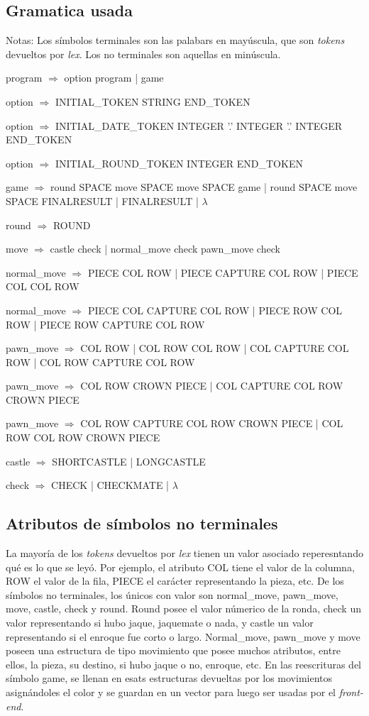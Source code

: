 \documentclass[a4paper,10pt]{article}
\begin{document}
\subsection{Gramatica usada}

Notas: Los símbolos terminales son las palabars en mayúscula, que son \textit{tokens} devueltos por \textit{lex}. Los no terminales 
son aquellas en minúscula.

program $\Rightarrow$  option program | game 

option $\Rightarrow$  INITIAL\_TOKEN STRING END\_TOKEN 

option $\Rightarrow$ INITIAL\_DATE\_TOKEN INTEGER '.' INTEGER '.' INTEGER END\_TOKEN 

option $\Rightarrow$ INITIAL\_ROUND\_TOKEN INTEGER END\_TOKEN 

game $\Rightarrow$ round SPACE move SPACE move SPACE game | round SPACE move SPACE FINALRESULT | FINALRESULT | $\lambda$

round $\Rightarrow$ ROUND               

move $\Rightarrow$  castle check | normal\_move check pawn\_move   check 

normal\_move $\Rightarrow$ PIECE COL ROW | PIECE CAPTURE COL ROW | PIECE COL COL ROW         

normal\_move $\Rightarrow$ PIECE COL CAPTURE COL ROW | PIECE ROW COL ROW | PIECE ROW CAPTURE COL ROW 

pawn\_move $\Rightarrow$ COL ROW | COL ROW COL ROW | COL CAPTURE COL ROW  | COL ROW CAPTURE COL ROW      
       
pawn\_move $\Rightarrow$ COL ROW CROWN PIECE | COL CAPTURE COL ROW CROWN PIECE     

pawn\_move $\Rightarrow$ COL ROW CAPTURE COL ROW CROWN PIECE | COL ROW COL ROW CROWN PIECE         

castle $\Rightarrow$ SHORTCASTLE   | LONGCASTLE   

check $\Rightarrow$ CHECK  | CHECKMATE  | $\lambda$

\subsection{Atributos de símbolos no terminales }

La mayoría de los \textit{tokens} devueltos por \textit{lex} tienen un valor asociado reperesntando qué es lo que se leyó. Por ejemplo, 
el atributo COL tiene el valor de la columna, ROW el valor de la fila, PIECE el carácter representando la pieza, etc.
De los símbolos no terminales, los únicos con valor son normal\_move, pawn\_move, move, castle, check y round. Round posee el valor númerico de la ronda, 
check un valor representando si hubo jaque, jaquemate o nada, y castle un valor representando si el enroque fue corto o largo. Normal\_move, pawn\_move 
y move poseen una estructura de tipo movimiento que posee muchos atributos, entre ellos, la pieza, su destino, si hubo jaque o no, enroque, etc. En las 
reescrituras del símbolo game, se llenan en esats estructuras devueltas por los movimientos asignándoles el color y se guardan en un vector para luego 
ser usadas por el \textit{front-end}.
\end{document}
